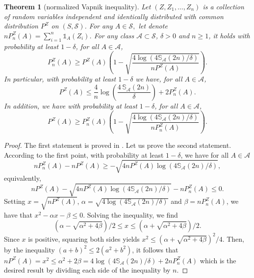 \documentclass[paper=a4, fontsize=11pt]{scrartcl}
\newcommand{\ind}{\mathds{1}}
\newcommand{\PP}{\mathbb{P}}
\newtheorem{theorem}{Theorem}
\begin{document}
\begin{theorem}[normalized Vapnik inequality] \label{th:vapnik_normalized}
 Let $(Z, Z_1, \ldots , Z_n) $ is a collection of random variables independent and identically distributed with common distribution $P^Z$ on $(S,\mathcal S)$. For any $A \in \mathcal{S},$ let denote $nP_n^Z(A) = \sum_{i=1}^n \ind_{A}(Z_i)$. For any class $\mathcal A\subset \mathcal S $, $\delta > 0$ and $n\geq 1$, it holds with probability at least $1 -\delta $, for all $A\in \mathcal A$,
$$ P_n^Z(A) \geq P^Z(A) \left(1-\sqrt { \frac{4 \log( 4\mathbb S_\mathcal A(2n) / \delta) }{ n P^Z(A)} } \right).$$ 
In particular, with probability at least $1-\delta$ we have, for all $A\in \mathcal A$,
$$   P^Z(A) \leq \dfrac{4}{n} \log\left(\dfrac{4\, \mathbb S_\mathcal A(2n)}{\delta} \right) + 2 P_n^Z(A).$$ 
In addition, we have with probability at least $1-\delta$, for all $A\in \mathcal A$,
$$  P^Z(A) \geq P^Z_n (A) \left(1-\sqrt { \frac{4 \log( 4 \mathbb S_\mathcal A(2n) / \delta) }{ nP^Z_n (A)} } \right)  . $$
\end{theorem}

\begin{proof}
    The first statement is proved in \cite{anthony1993result}.   Let us  prove the second statement. According to the first point, with probability at least $1 - \delta$, we have for all $A \in \mathcal{A}$ $$n P_n^Z(A) - n P^Z(A) \geq     - \sqrt{  4nP^Z(A)    \log(4\mathbb S_{\mathcal A}(2n) /\delta )   },$$   equivalently,  
    $$nP^Z(A) - \sqrt{  4nP^Z(A)    \log(4\mathbb S_{\mathcal A}(2n) /\delta )   } -  n P_n^Z(A)\leq 0.$$
    Setting $x = \sqrt{nP^Z(A)}$, $\alpha = \sqrt{  4 \log(4\mathbb S_{\mathcal A}(2n) /\delta )}$ and $\beta = nP_n^Z(A)$, we have that $x^2 - \alpha x - \beta \leq 0.$ Solving the inequality, we find  $$( \alpha - \sqrt{\alpha^2 + 4\beta}) / 2 \leq x \leq ( \alpha + \sqrt{\alpha^2 + 4\beta} ) / 2.$$ 
    Since $x$ is positive, squaring both sides yields $x^2 \leq ( \alpha + \sqrt{\alpha^2 + 4\beta})^2 / 4$. Then, by the inequality \((a+b)^2 \leq 2(a^2 + b^2)\), it follows that $nP^Z(A) = x^2 \leq \alpha^2 + 2\beta = 4 \log(4\mathbb S_{\mathcal A}(2n) /\delta ) + 2nP_n^Z(A)$
    which is the desired result by dividing each side of the inequality by \(n\).   
\end{proof}



\end{document}
